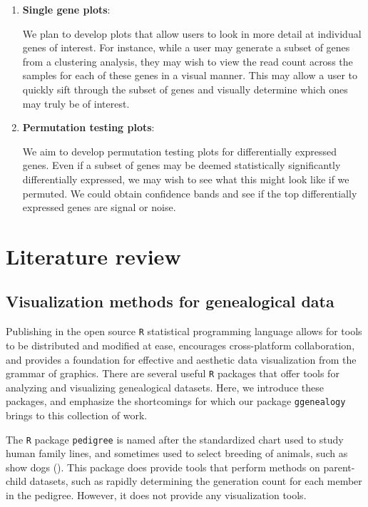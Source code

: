 \documentclass[11pt,a4paper,oldfontcommands,openany]{memoir}
\numberwithin{equation}{section} %
\newcommand{\pkg}[1]{{\texttt{#1}}}
\begin{document}
\begin{enumerate}
\item \textbf{Single gene plots}:

We plan to develop plots that allow users to look in more detail at individual genes of interest. For instance, while a user may generate a subset of genes from a clustering analysis, they may wish to view the read count across the samples for each of these genes in a visual manner. This may allow a user to quickly sift through the subset of genes and visually determine which ones may truly be of interest.

\item \textbf{Permutation testing plots}:

We aim to develop permutation testing plots for differentially expressed genes. Even if a subset of genes may be deemed statistically significantly differentially expressed, we may wish to see what this might look like if we permuted. We could obtain confidence bands and see if the top differentially expressed genes are signal or noise.

\end{enumerate}


\section{Literature review}
\label{sec:litReview}
\subsection{Visualization methods for genealogical data}

Publishing in the open source \pkg{R} statistical programming language allows for tools to be distributed and modified at ease, encourages cross-platform collaboration, and provides a foundation for effective and aesthetic data visualization from the grammar of graphics. There are several useful \pkg{R} packages that offer tools for analyzing and visualizing genealogical datasets. Here, we introduce these packages, and emphasize the shortcomings for which our package \pkg{ggenealogy} brings to this collection of work.

The \pkg{R} package \pkg{pedigree} is named after the standardized chart used to study human family lines, and sometimes used to select breeding of animals, such as show dogs (\citealt{ped}). This package does provide tools that perform methods on parent-child datasets, such as rapidly determining the generation count for each member in the pedigree. However, it does not provide any visualization tools.
\end{document}
